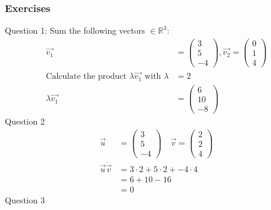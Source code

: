 \documentclass{article}
\begin{document}
\subsubsection{Exercises}
Question 1:
Sum the following vectors $\in \mathbb{R}^3$:
\begin{align*}
    \vec{v_1}                                                                 & = \begin{pmatrix} 3 \\ 5 \\ -4 \end{pmatrix}, \vec{v_2} = \begin{pmatrix} 0 \\ 1 \\ 4 \end{pmatrix} \\
    \textrm{Calculate the product } \lambda \vec{v_1} \textrm{ with } \lambda & = 2                                                                                                 \\
    \lambda \vec{v_1}                                                         & = \begin{pmatrix} 6 \\ 10 \\ -8 \end{pmatrix}
\end{align*}
Question 2
\begin{align*}
    \vec{u}              & = \begin{pmatrix} 3 \\ 5 \\ -4 \end{pmatrix} \quad \vec{v} = \begin{pmatrix} 2 \\ 2 \\ 4 \end{pmatrix} \\
    \vec{u} \dot \vec{v} & = 3 \cdot 2 + 5 \cdot 2 + -4 \cdot 4                                                                   \\
                         & = 6 + 10 - 16                                                                                          \\
                         & = 0
\end{align*}
Question 3
\end{document}
